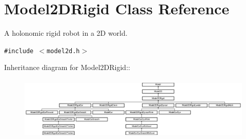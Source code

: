 \section{Model2DRigid  Class Reference}
\label{classModel2DRigid}
A holonomic rigid robot in a 2D world. 


{\tt \#include $<$model2d.h$>$}

Inheritance diagram for Model2DRigid::\begin{figure}[H]
\begin{center}
\leavevmode
\includegraphics[height=3.03318cm]{classModel2DRigid}
\end{center}
\end{figure}
